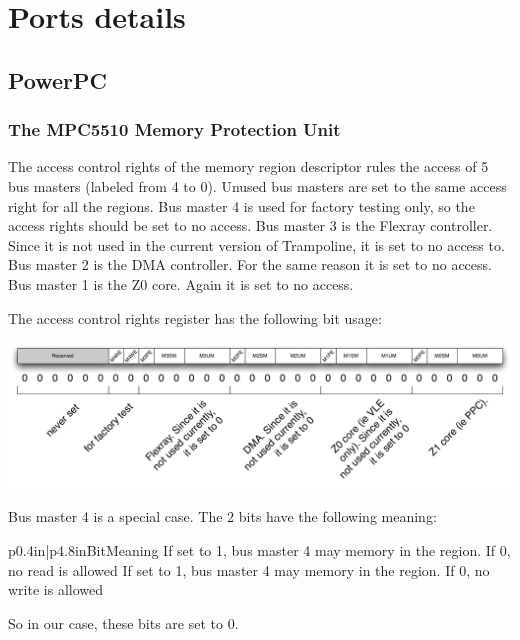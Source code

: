 
\chapter{Ports details}

\section{PowerPC}

\subsection{The MPC5510 Memory Protection Unit}

The access control rights of the memory region descriptor rules the access of 5 bus masters (labeled from 4 to 0). Unused bus masters are set to the same access right for all the regions. Bus master 4 is used for factory testing only, so the access rights should be set to no access. Bus master 3 is the Flexray controller. Since it is not used in the current version of Trampoline, it is set to no access to. Bus master 2 is the DMA controller. For the same reason it is set to no access. Bus master 1 is the Z0 core. Again it is set to no access.

The access control rights register has the following bit usage:

\includegraphics[width=\textwidth]{pictures/MPUacr.pdf} 

Bus master 4 is a special case. The 2 bits have the following meaning:

\begin{longtableii}{p{0.4in}|p{4.8in}}{}{Bit}{Meaning}
  {If set to 1, bus master 4 may  memory in the region. If 0, no read is allowed}
  {If set to 1, bus master 4 may  memory in the region. If 0, no write is allowed}
\end{longtableii}

So in our case, these bits are set to 0.

